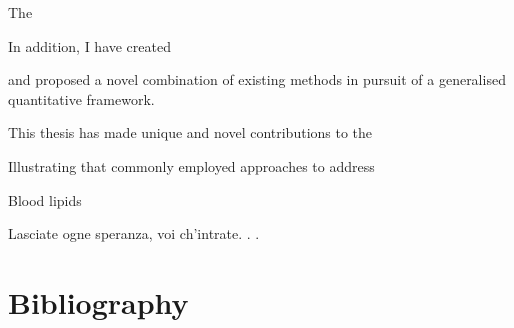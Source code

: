 \documentclass[a4paper, twoside]{templates/ociamthesis}
\begin{document}
The

In addition, I have created

and proposed a novel combination of existing methods in pursuit of a generalised quantitative framework.

This thesis has made unique and novel contributions to the

Illustrating that commonly employed approaches to address

Blood lipids

\begin{savequote}
Lasciate ogne speranza, voi ch'intrate. . .
\end{savequote}

\hypertarget{bibliography}{%
\chapter{Bibliography}\label{bibliography}}
\end{document}
